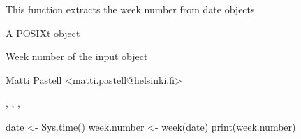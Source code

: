 \begin{Description}\relax
This function extracts the week number from date objects
\end{Description}
\begin{Arguments}
\begin{ldescription}
\item[\code{x}] A POSIXt object
\end{ldescription}
\end{Arguments}
\begin{Value}
\begin{ldescription}
\item[\code{week}] Week number of the input object
\end{ldescription}
\end{Value}
\begin{Author}\relax
Matti Pastell <matti.pastell@helsinki.fi>
\end{Author}
\begin{SeeAlso}\relax
{}, ,
, 
\end{SeeAlso}
\begin{Examples}
\begin{ExampleCode}
date <- Sys.time()
week.number <- week(date)
print(week.number)
\end{ExampleCode}
\end{Examples}

